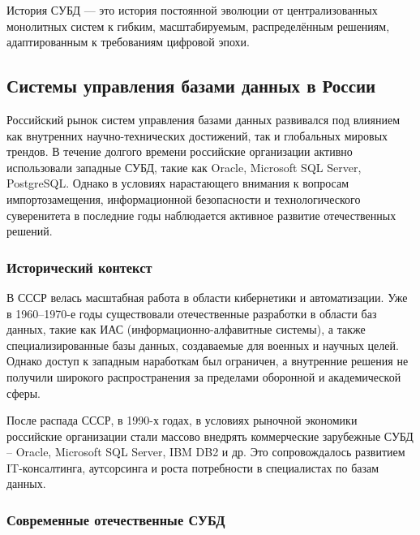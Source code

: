 История СУБД — это история постоянной эволюции от централизованных монолитных систем к гибким, масштабируемым, распределённым решениям, адаптированным к требованиям цифровой эпохи.

\subsection{Системы управления базами данных в России}

Российский рынок систем управления базами данных развивался под влиянием как внутренних научно-технических достижений, так и глобальных мировых трендов. В течение долгого времени российские организации активно использовали западные СУБД, такие как Oracle, Microsoft SQL Server, PostgreSQL. Однако в условиях нарастающего внимания к вопросам импортозамещения, информационной безопасности и технологического суверенитета в последние годы наблюдается активное развитие отечественных решений.

\subsubsection{Исторический контекст}

В СССР велась масштабная работа в области кибернетики и автоматизации. Уже в 1960--1970-е годы существовали отечественные разработки в области баз данных, такие как ИАС (информационно-алфавитные системы), а также специализированные базы данных, создаваемые для военных и научных целей. Однако доступ к западным наработкам был ограничен, а внутренние решения не получили широкого распространения за пределами оборонной и академической сферы.

После распада СССР, в 1990-х годах, в условиях рыночной экономики российские организации стали массово внедрять коммерческие зарубежные СУБД -- Oracle, Microsoft SQL Server, IBM DB2 и др. Это сопровождалось развитием IT-консалтинга, аутсорсинга и роста потребности в специалистах по базам данных.

\subsubsection{Современные отечественные СУБД}

